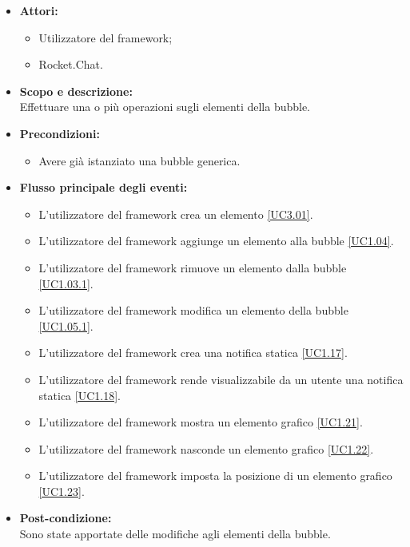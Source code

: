 \begin{itemize}
	\item \textbf{Attori:}
	\begin{itemize}
		\item Utilizzatore del framework;
		\item Rocket.Chat.
	\end{itemize}
	\item \textbf{Scopo e descrizione:} 
	\\Effettuare una o più operazioni sugli elementi della bubble.
	\item \textbf{Precondizioni:}
	\begin{itemize}
		\item Avere già istanziato una bubble generica.
	\end{itemize}
	\item \textbf{Flusso principale degli eventi:}
	\begin{itemize}
		\item L'utilizzatore del framework crea un elemento \ref{UC3.01}.
		\item L'utilizzatore del framework aggiunge un elemento alla bubble \ref{UC1.04}.
		\item L'utilizzatore del framework rimuove un elemento dalla bubble \ref{UC1.03.1}.
		\item L'utilizzatore del framework modifica un elemento della bubble \ref{UC1.05.1}.
		\item L'utilizzatore del framework crea una notifica statica \ref{UC1.17}.
		\item L'utilizzatore del framework rende visualizzabile da un utente una notifica statica \ref{UC1.18}.
		\item L'utilizzatore del framework mostra un elemento grafico \ref{UC1.21}.
		\item L'utilizzatore del framework nasconde un elemento grafico \ref{UC1.22}.
		\item L'utilizzatore del framework imposta la posizione di un elemento grafico \ref{UC1.23}.
	\end{itemize}
	\item \textbf{Post-condizione:}
	\\Sono state apportate delle modifiche agli elementi della bubble.
\end{itemize}


